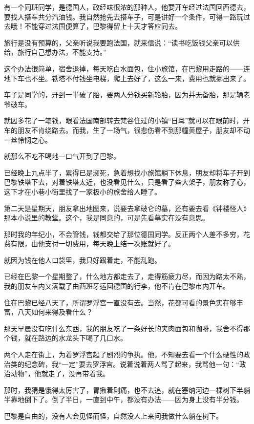 \par 有一个同班同学，是德国人，政经味很浓的那种人，他要开车经过法国回西德去，要找人搭车共分汽油钱。我自然抢先去搭车子，可是讲好一个条件，可得一路玩过去哦！不能穿过法国便算了，巴黎得留上十天才答应同去。
\par 旅行是没有预算的，父亲听说我要跑法国，就来信说：“读书吃饭钱父亲可以供给，旅行自己想办法，不能支持。”
\par 这个办法很简单，宿舍退掉，每天吃白水面包，住小旅馆，在巴黎用走路的——连地下车也不坐。铁塔不付钱坐电梯，爬上去好了，这么一来，费用也就挪出来了。
\par 车子是同学的，开到一半破了胎，要两人分钱买新轮胎，因为并无备胎，那是辆老爷破车。
\par 就因多花了一笔钱，眼看法国南部转去梵谷住过的小镇“日耳”就可以在眼前时，开车的朋友不肯绕路去。而我，生了一场气，很悲伤看不到那幢黄屋子，朋友却不动一丝怜悯之心。
\par 就那么不吃不喝地一口气开到了巴黎。
\par 已经晚上九点半了，累得已是濒死，急着想找小旅馆躺下休息，朋友却将车子开到巴黎铁塔下去，对着铁塔太近，也没看见什么，只是看了些大架子，朋友称了心，这下才在小巷小街里找了一家极小的旅舍给人睡了。
\par 第二天是星期天，朋友拿出地图来，说要去拿破仑的墓，还有要去看《钟楼怪人》那本小说里的教堂。这个，我是同意的，可是先看墓实在没有意思。
\par 那时我的年纪小，不会管钱，钱都交给了那位德国同学。反正两个人差不多穷，花费有限，由他支付一切费用，每天晚上结一次账就好了。
\par 就因为钱在他人口袋里，我只好跟着走，不能乱跑。
\par 已经在巴黎一个星期整了，什么地方都走去了，走得筋疲力尽，而因为路太不熟，我的朋友车内又满载了由西班牙运回德国的行李，他不肯在巴黎市内开车。
\par 住在巴黎已经八天了，所谓罗浮宫一直没有去。当然，花都可看的景色实在够丰富，八天如何来得及看什么？
\par 那天早晨没有吃什么东西，我的朋友吃了一条好长的夹肉面包和咖啡，我舍不得那个钱，就在路边的水龙头下喝了几口水。
\par 两个人走在街上，为着罗浮宫起了剧烈的争执。他，不知要去看一个什么硬性的政治类的纪念碑，我“一定”要去罗浮宫。说着说着两人骂了起来，我骂他一句：“政治动物”，他就走了，没再带着我。
\par 那时，我猜是饿得太厉害了，胃揪着剧痛，也不去追，就在塞纳河边一棵树下半躺半靠地倒下了。倒了半日，一直到中午，都没有办法——因为身上没有半分钱。
\par 巴黎是自由的，没有人会见怪而怪，自然没人上来问我做什么躺在树下。

